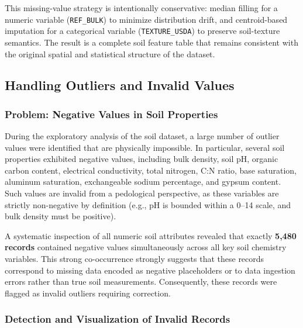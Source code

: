 This missing-value strategy is intentionally conservative:
median filling for a numeric variable (\texttt{REF\_BULK}) to minimize distribution drift,
and centroid-based imputation for a categorical variable (\texttt{TEXTURE\_USDA}) to preserve soil-texture semantics.
The result is a complete soil feature table that remains consistent with the original spatial and statistical structure of the dataset.


\subsection{Handling Outliers and Invalid Values}\label{subsec:handling_outliers}

\subsubsection{Problem: Negative Values in Soil Properties}

During the exploratory analysis of the soil dataset, a large number of outlier values were identified that are physically impossible. In particular, several soil properties exhibited negative values, including bulk density, soil pH, organic carbon content, electrical conductivity, total nitrogen, C:N ratio, base saturation, aluminum saturation, exchangeable sodium percentage, and gypsum content. Such values are invalid from a pedological perspective, as these variables are strictly non-negative by definition (e.g., pH is bounded within a 0--14 scale, and bulk density must be positive).

A systematic inspection of all numeric soil attributes revealed that exactly \textbf{5,480 records} contained negative values simultaneously across all key soil chemistry variables. This strong co-occurrence strongly suggests that these records correspond to missing data encoded as negative placeholders or to data ingestion errors rather than true soil measurements. Consequently, these records were flagged as invalid outliers requiring correction.

\subsubsection{Detection and Visualization of Invalid Records}

